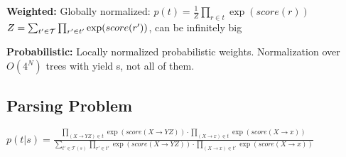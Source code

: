 \textbf{Weighted:} Globally normalized: $p(t) = \frac{1}{Z}\prod_{r \in t} \exp (score(r))$\\
$Z = \sum_{t' \in \mathcal{T}} \prod_{r' \in t'} \exp (score(r'))$, can be infinitely big\\
\begin{comment}
	The outcome of the production rules can be assigned probabilities, which is also a form of weighting. 
	The probability of a tree can then be derived by multiplying the probabilities of the nodes together.\\
	Instead of probabilities, the rules can also be assigned generic positive weights. 
	Weighted Grammar normaliser is $Z = \sum_{t' \in \mathcal{T}}\prod_{r' \in t'} \exp (score(r'))$.
	The normaliser is then an infinite sum and can even be bigger than $\Sigma^*$, due to ambiguities in the creation of a string. Assume production rules $S \rightarrow S$ and $S \rightarrow a$.\\
\end{comment} 

\textbf{Probabilistic:} Locally normalized probabilistic weights. Normalization over $O(4^N)$ trees with yield s, not all of them.\\
\begin{comment}
	For a production rule $N\rightarrow a_1 | ... | a_k$, it must hold that $\sum^K p(\alpha_k | N) = 1$\\
\end{comment} 

\subsection{Parsing Problem}
\begin{comment}
	\textbf{Goal:} Take an input sequence, produce a parse tree.\\
\end{comment} 


$p(t|s) = \frac{\prod_{(X \rightarrow Y Z) \in t} \exp(score(X \rightarrow YZ))  \cdot   \prod_{(X \rightarrow x) \in t} \exp(score(X \rightarrow x))}{\sum_{t' \in \mathcal{T}(s)} \prod_{r' \in t'} \exp(score(X \rightarrow YZ))  \cdot   \prod_{(X \rightarrow x) \in t'} \exp(score(X \rightarrow x))}$\\
\begin{comment}
	This is different than normalising over infinite strings as seen in the WCFG before.\\
	T(s) is the set of trees that have the yield s, e.g. all trees that form the sentence s.
	The normalizer can still diverge, for example the grammar $S \rightarrow S$, $S \rightarrow a$ forming string "a".\\
	We already build in the structural assumption along the production rules of the grammar and that the grammar is in CNF. 	Note that the number of trees is no longer infinite, since there are no cyclic rules.\\
\end{comment} 

